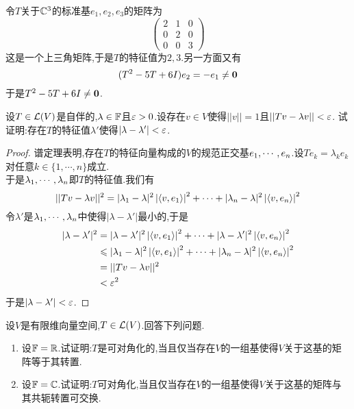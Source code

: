 \documentclass{ctexart}
\begin{document}
\begin{solution}
    令$T$关于$\mathbb{C}^3$的标准基$e_1,e_2,e_3$的矩阵为
    \[\begin{pmatrix}
        2&1&0\\0&2&0\\0&0&3
    \end{pmatrix}\]
    这是一个上三角矩阵,于是$T$的特征值为$2,3$.另一方面又有
    \[(T^2-5T+6I)e_2=-e_1\neq\mathbf0\]
    于是$T^2-5T+6I\neq\mathbf0$.
\end{solution}
\begin{problem}[23.]
    设$T\in\mathcal{L}(V)$是自伴的,$\lambda\in\mathbb{F}$且$\varepsilon>0$.设存在$v\in V$使得$||v||=1$且$||Tv-\lambda v||<\varepsilon$.%
    试证明:存在$T$的特征值$\lambda'$使得$|\lambda-\lambda'|<\varepsilon$.
\end{problem}
\begin{proof}
    谱定理表明,存在$T$的特征向量构成的$V$的规范正交基${e}_1,\cdots,{e}_{n}$.设$Te_k=\lambda_ke_k$对任意$k\in\{1,\cdots,n\}$成立.\\
    于是${\lambda}_1,\cdots,{\lambda}_{n}$即$T$的特征值.我们有
    \[||Tv-\lambda v||^2=|\lambda_1-\lambda|^2\left|\left\langle{v},{e_1}\right\rangle\right|^2+\cdots+|\lambda_n-\lambda|^2\left|\left\langle{v},{e_n}\right\rangle\right|^2\]
    令$\lambda'$是${\lambda}_1,\cdots,{\lambda}_{n}$中使得$|\lambda-\lambda'|$最小的,于是
    \[\begin{aligned}
        |\lambda-\lambda'|^2
        &= |\lambda-\lambda'|^2\left|\left\langle{v},{e_1}\right\rangle\right|^2+\cdots+|\lambda-\lambda'|^2\left|\left\langle{v},{e_n}\right\rangle\right|^2 \\
        &\leqslant |\lambda_1-\lambda|^2\left|\left\langle{v},{e_1}\right\rangle\right|^2+\cdots+|\lambda_n-\lambda|^2\left|\left\langle{v},{e_n}\right\rangle\right|^2 \\
        &= ||Tv-\lambda v||^2 \\
        &< \varepsilon^2
    \end{aligned}\]
    于是$|\lambda-\lambda'|<\varepsilon$.
\end{proof}
\begin{problem}[24.]
    设$V$是有限维向量空间,$T\in\mathcal{L}(V)$.回答下列问题.
    \begin{enumerate}[label=\tbf{(\arabic*)}]
        \item 设$\mathbb{F}=\mathbb{R}$.试证明:$T$是可对角化的,当且仅当存在$V$的一组基使得$V$关于这基的矩阵等于其转置.
        \item 设$\mathbb{F}=\mathbb{C}$.试证明:$T$可对角化,当且仅当存在$V$的一组基使得$V$关于这基的矩阵与其共轭转置可交换.
    \end{enumerate}
\end{problem}
\end{document}
